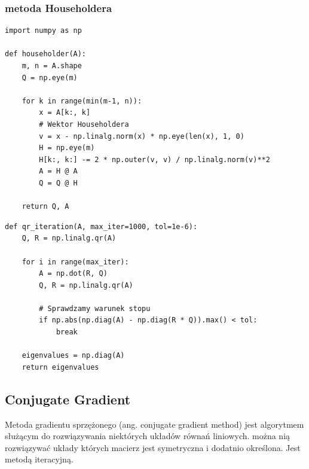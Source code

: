 \documentclass[11pt]{beamer}
\begin{document}
\subsubsection{metoda Householdera}
\begin{frame}[containsverbatim]{\subsubsecname}

\begin{verbatim}
import numpy as np

def householder(A):
    m, n = A.shape
    Q = np.eye(m)

    for k in range(min(m-1, n)):
        x = A[k:, k]
        # Wektor Householdera
        v = x - np.linalg.norm(x) * np.eye(len(x), 1, 0)
        H = np.eye(m)
        H[k:, k:] -= 2 * np.outer(v, v) / np.linalg.norm(v)**2
        A = H @ A
        Q = Q @ H

    return Q, A
\end{verbatim}

\end{frame}

\begin{frame}[containsverbatim]{\subsecname}

\begin{verbatim}
def qr_iteration(A, max_iter=1000, tol=1e-6):
    Q, R = np.linalg.qr(A)

    for i in range(max_iter):
        A = np.dot(R, Q)
        Q, R = np.linalg.qr(A)

        # Sprawdzamy warunek stopu
        if np.abs(np.diag(A) - np.diag(R * Q)).max() < tol:
            break

    eigenvalues = np.diag(A)
    return eigenvalues
\end{verbatim}
\end{frame}

\subsection{Conjugate Gradient}
\begin{frame}{\subsecname}
	Metoda gradientu sprzężonego (ang. conjugate gradient method) jest algorytmem służącym do rozwiązywania niektórych układów równań liniowych. można nią rozwiązywać układy których macierz jest symetryczna i dodatnio określona. Jest metodą iteracyjną.
\end{frame}
\end{document}
